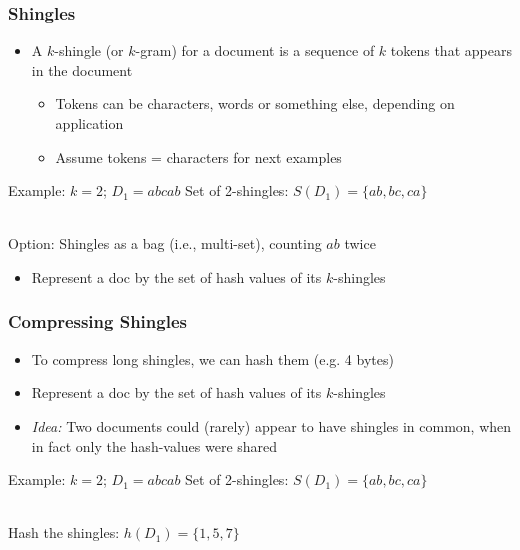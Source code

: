 \documentclass[svgnames]{beamer}
\begin{document}
\begin{frame} \frametitle{Shingles}

\begin{itemize}
\item A $k$-shingle (or $k$-gram) for a document is a sequence of $k$ tokens that appears in the document
  \begin{itemize}
  \item Tokens can be characters, words or something else, depending on application
  \item Assume tokens = characters for next examples
  \end{itemize}
\end{itemize}

\begin{block}{Example: $k=2$; $D_1=abcab$}
  Set of 2-shingles: $S(D_1)=\{ab, bc, ca\}$
  
  ~\\
  Option: Shingles as a bag (i.e., multi-set), counting $ab$ twice
\end{block}
\begin{itemize}
\item Represent a doc by the set of hash values of its $k$-shingles
\end{itemize}

\end{frame}

  
\begin{frame} \frametitle{Compressing Shingles}

\begin{itemize}
\item To compress long shingles, we can hash them (e.g. 4 bytes)

\item Represent a doc by the set of hash values of its $k$-shingles

\item \emph{Idea:} Two documents could (rarely) appear to have shingles in common, when in fact only the hash-values were shared
\end{itemize}

\begin{block}{Example: $k=2$; $D_1=abcab$}
  Set of 2-shingles: $S(D_1)=\{ab, bc, ca\}$
  
  ~\\
  Hash the shingles: $h(D_1)=\{1, 5, 7\}$
\end{block}
\end{frame}
\end{document}

